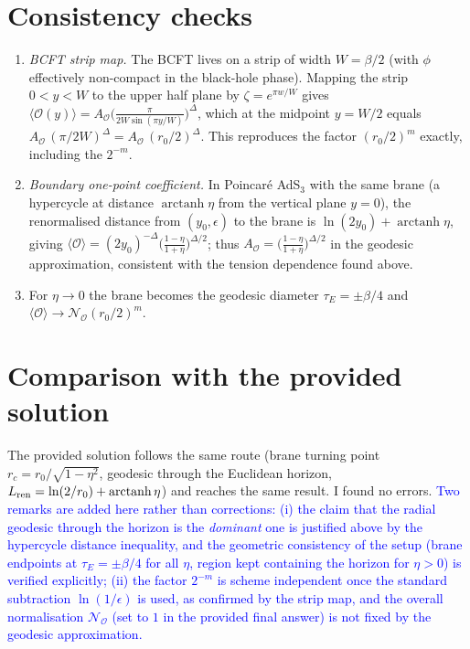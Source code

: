 \documentclass[11pt]{article}
\newcommand{\chg}[1]{\textcolor{blue}{#1}}
\newcommand{\arctanh}{\operatorname{arctanh}}
\begin{document}
\section{Consistency checks}
\begin{enumerate}
\item \emph{BCFT strip map.} The BCFT lives on a strip of width $W=\beta/2$ (with $\phi$ effectively non-compact in the black-hole phase). Mapping the strip $0<y<W$ to the upper half plane by $\zeta=e^{\pi w/W}$ gives $\langle\mathcal O(y)\rangle=A_{\mathcal O}\big(\frac{\pi}{2W\sin(\pi y/W)}\big)^{\Delta}$, which at the midpoint $y=W/2$ equals $A_{\mathcal O}\,(\pi/2W)^{\Delta}=A_{\mathcal O}\,(r_0/2)^{\Delta}$. This reproduces the factor $(r_0/2)^{m}$ exactly, including the $2^{-m}$.
\item \emph{Boundary one-point coefficient.} In Poincar\'e AdS$_3$ with the same brane (a hypercycle at distance $\arctanh\eta$ from the vertical plane $y=0$), the renormalised distance from $(y_0,\epsilon)$ to the brane is $\ln(2y_0)+\arctanh\eta$, giving $\langle\mathcal O\rangle=(2y_0)^{-\Delta}\big(\frac{1-\eta}{1+\eta}\big)^{\Delta/2}$; thus $A_{\mathcal O}=\big(\frac{1-\eta}{1+\eta}\big)^{\Delta/2}$ in the geodesic approximation, consistent with the tension dependence found above.
\item For $\eta\to0$ the brane becomes the geodesic diameter $\tau_E=\pm\beta/4$ and $\langle\mathcal O\rangle\to\mathcal N_{\mathcal O}(r_0/2)^{m}$.
\end{enumerate}

\section{Comparison with the provided solution}
The provided solution follows the same route (brane turning point $r_c=r_0/\sqrt{1-\eta^2}$, geodesic through the Euclidean horizon, $L_{\rm ren}=\ln(2/r_0)+\arctanh\eta$) and reaches the same result. I found no errors. \chg{Two remarks are added here rather than corrections: (i) the claim that the radial geodesic through the horizon is the \emph{dominant} one is justified above by the hypercycle distance inequality, and the geometric consistency of the setup (brane endpoints at $\tau_E=\pm\beta/4$ for all $\eta$, region kept containing the horizon for $\eta>0$) is verified explicitly; (ii) the factor $2^{-m}$ is scheme independent once the standard subtraction $\ln(1/\epsilon)$ is used, as confirmed by the strip map, and the overall normalisation $\mathcal N_{\mathcal O}$ (set to $1$ in the provided final answer) is not fixed by the geodesic approximation.}
\end{document}
